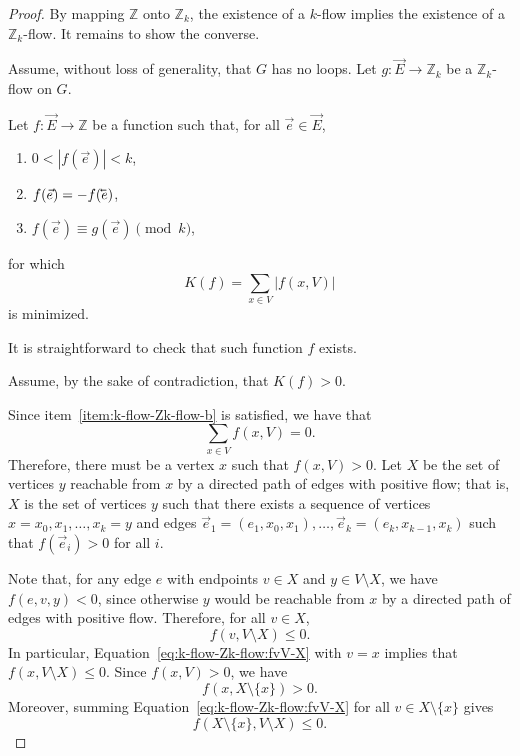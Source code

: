 \begin{proof}
	By mapping \(\mathbb{Z}\) onto \(\mathbb{Z}_k\), the existence of a \(k\)-flow implies the existence of a \(\mathbb{Z}_k\)-flow. It remains to show the converse.

	Assume, without loss of generality, that \(G\) has no loops.
	Let \(g \colon \vec{E} \to \mathbb{Z}_k\) be a \(\mathbb{Z}_k\)-flow on \(G\).

	Let \(f \colon \vec{E} \to \mathbb{Z}\) be a function such that, for all \(\vec{e} \in \vec{E}\),
	\begin{enumerate}
		\item \(0 < |f(\vec{e})| < k\),
		\label{item:k-flow-Zk-flow-a}
		\item \(f(\vec{e}) = -f(\cev{e})\),
		\label{item:k-flow-Zk-flow-b}
		\item \(f(\vec{e}) \equiv g(\vec{e}) \pmod{k}\),
		\label{item:k-flow-Zk-flow-c}
	\end{enumerate}
	for which 
	\begin{equation}
		K(f) = \sum_{x \in V} |f(x, V)|
	\end{equation}
	is minimized.

	It is straightforward to check that such function \(f\) exists.

	Assume, by the sake of contradiction, that \(K(f) > 0\).

	Since item~\ref{item:k-flow-Zk-flow-b} is satisfied, we have that
	\begin{equation}
		\sum_{x \in V} f(x, V) = 0.
	\end{equation}
	Therefore, there must be a vertex \(x\) such that \(f(x, V) > 0\).
	Let \(X\) be the set of vertices \(y\) reachable from \(x\) by a directed path of edges with positive flow;
	that is, \(X\) is the set of vertices \(y\) such that there exists a sequence of vertices \(x = x_0, x_1, \ldots, x_k = y\) and edges \(\vec{e}_1 = (e_1, x_0, x_1), \ldots, \vec{e}_k = (e_k, x_{k-1}, x_k)\) such that \(f(\vec{e}_i) > 0\) for all \(i\).

	Note that, for any edge \(e\) with endpoints \(v \in X\) and \(y \in V \setminus X\), we have \(f(e, v, y) < 0\), since otherwise \(y\) would be reachable from \(x\) by a directed path of edges with positive flow.
	Therefore,
	for all \(v \in X\),
	\begin{equation} \label{eq:k-flow-Zk-flow:fvV-X}
		f(v, V \setminus X) \leq 0.
	\end{equation}
	In particular, Equation~\eqref{eq:k-flow-Zk-flow:fvV-X} with \(v = x\) implies that
	\(f(x, V \setminus X) \leq 0\).
	Since \(f(x, V) > 0\), we have 
	\begin{equation} \label{eq:k-flow-Zk-flow:fxV-X}
		f(x, X \setminus \{x\}) > 0.
	\end{equation}
	Moreover, summing Equation~\eqref{eq:k-flow-Zk-flow:fvV-X} for all \(v \in X \setminus \{x\}\) gives
	\begin{equation} \label{eq:k-flow-Zk-flow:sumfX-xV-X}
		f(X \setminus \{x\}, V \setminus X) \leq 0.
	\end{equation}


\end{proof}
